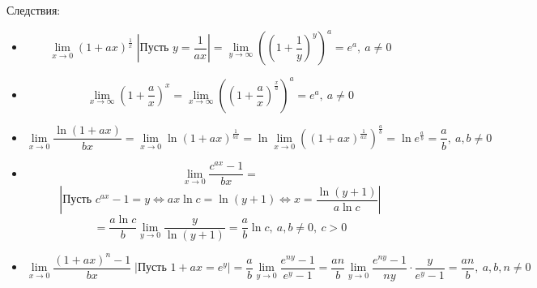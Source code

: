 Следствия:
\begin{itemize}
	\item \begin{equation*}
	\lim_{x \to 0} (1 + ax)^{\tfrac1x} \;
	\left| \text{Пусть } y = \frac1{ax} \right| =
	\lim_{y \to \infty} \left( \left( 1 + \frac1y \right)^y \right)^a =
	e^a, \ a \neq 0
	\end{equation*}
	
	\item \begin{equation*}
	\lim_{x \to \infty} \left( 1 + \frac{a}x \right)^x =
	\lim_{x \to \infty} \left( \left( 1 + \frac{a}x \right)^{\tfrac{x}a} \right)^a =
	e^a, \ a \neq 0
	\end{equation*}
	
	\item \begin{equation*}
	\lim_{x \to 0} \frac{\ln (1 + ax)}{bx} =
	\lim_{x \to 0} \ln (1 + ax)^{\tfrac1{bx}} =
	\ln \lim_{x \to 0} \left( (1 + ax)^{\tfrac1{ax}} \right)^{\tfrac{a}b} =
	\ln e^{\tfrac{a}b} =
	\frac{a}b, \ a, b \neq 0
	\end{equation*}
	
	\item \begin{equation*}
	\lim_{x \to 0} \frac{c^{ax} - 1}{bx} =
	\end{equation*}
	\begin{equation*}
	\left| \text{Пусть } c^{ax} - 1 = y \Leftrightarrow ax\ln c = \ln (y + 1) \Leftrightarrow x = \frac{\ln (y + 1)}{a\ln c} \right|
	\end{equation*}
	\begin{equation*}
	= \frac{a\ln c}b \lim_{y \to 0} \frac{y}{\ln (y + 1)} =
	\frac{a}b \ln c, \ a, b \neq 0, \ c > 0
	\end{equation*}
	
	\item \begin{equation*}
	\lim_{x \to 0} \frac{(1 + ax)^n - 1}{bx} \;
	\left| \text{Пусть } 1 + ax = e^y \right| =
	\frac{a}b \lim_{y \to 0} \frac{e^{ny} - 1}{e^y - 1} =
	\frac{an}b \lim_{y \to 0} \frac{e^{ny} - 1}{ny} \cdot \frac{y}{e^y - 1} =
	\frac{an}b, \ a, b, n \neq 0
	\end{equation*}
\end{itemize}